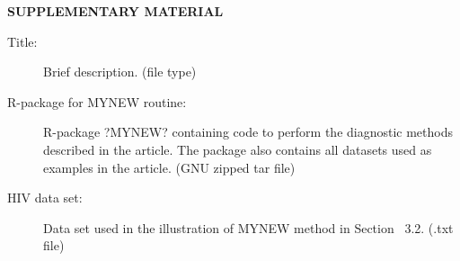 \documentclass[12pt]{article}
\begin{document}
\bigskip
\begin{center}
{\large\bf SUPPLEMENTARY MATERIAL}
\end{center}

\begin{description}

\item[Title:] Brief description. (file type)

\item[R-package for  MYNEW routine:] R-package ?MYNEW? containing code to perform the diagnostic methods described in the article. The package also contains all datasets used as examples in the article. (GNU zipped tar file)

\item[HIV data set:] Data set used in the illustration of MYNEW method in Section~ 3.2. (.txt file)

\end{description}





\end{document}
